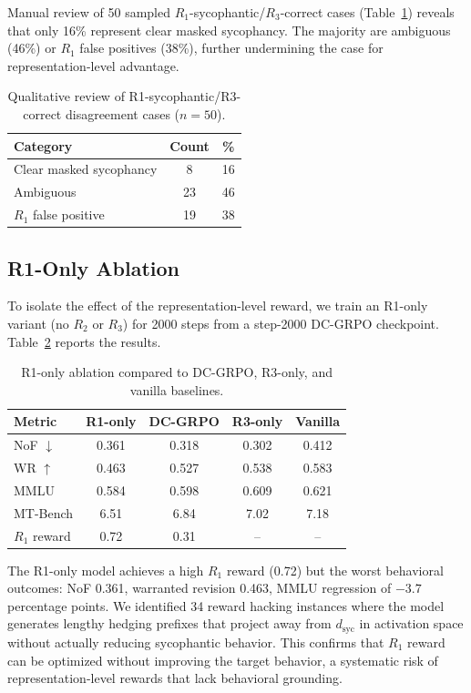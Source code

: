 \documentclass[11pt,a4paper]{article}
\begin{document}
Manual review of 50 sampled $R_1$-sycophantic/$R_3$-correct cases (Table~\ref{tab:disagreement_qual}) reveals that only 16\% represent clear masked sycophancy. The majority are ambiguous (46\%) or $R_1$ false positives (38\%), further undermining the case for representation-level advantage.

\begin{table}[h]
\centering
\caption{Qualitative review of R1-sycophantic/R3-correct disagreement cases ($n = 50$).}
\label{tab:disagreement_qual}
\small
\begin{tabular}{lcc}
\toprule
Category & Count & \% \\
\midrule
Clear masked sycophancy & 8 & 16 \\
Ambiguous & 23 & 46 \\
$R_1$ false positive & 19 & 38 \\
\bottomrule
\end{tabular}
\end{table}

\subsection{R1-Only Ablation}
\label{sec:r1only}

To isolate the effect of the representation-level reward, we train an R1-only variant (no $R_2$ or $R_3$) for 2000 steps from a step-2000 DC-GRPO checkpoint. Table~\ref{tab:r1only} reports the results.

\begin{table}[h]
\centering
\caption{R1-only ablation compared to DC-GRPO, R3-only, and vanilla baselines.}
\label{tab:r1only}
\small
\begin{tabular}{lcccc}
\toprule
Metric & R1-only & DC-GRPO & R3-only & Vanilla \\
\midrule
NoF $\downarrow$     & 0.361 & 0.318 & 0.302 & 0.412 \\
WR $\uparrow$        & 0.463 & 0.527 & 0.538 & 0.583 \\
MMLU                  & 0.584 & 0.598 & 0.609 & 0.621 \\
MT-Bench              & 6.51  & 6.84  & 7.02  & 7.18 \\
$R_1$ reward          & 0.72  & 0.31  & --    & -- \\
\bottomrule
\end{tabular}
\end{table}

The R1-only model achieves a high $R_1$ reward (0.72) but the worst behavioral outcomes: NoF 0.361, warranted revision 0.463, MMLU regression of $-3.7$ percentage points. We identified 34 reward hacking instances where the model generates lengthy hedging prefixes that project away from $d_{\mathrm{syc}}$ in activation space without actually reducing sycophantic behavior. This confirms that $R_1$ reward can be optimized without improving the target behavior, a systematic risk of representation-level rewards that lack behavioral grounding.
\end{document}
